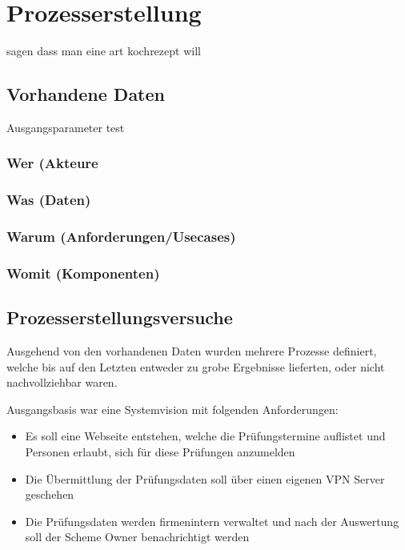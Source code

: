 \chapter{Prozesserstellung}

sagen dass man eine art kochrezept will

\section{Vorhandene Daten}
Ausgangsparameter test
\subsection{Wer (Akteure}
\subsection{Was (Daten)}
\subsection{Warum (Anforderungen/Usecases)}
\subsection{Womit (Komponenten)}

\section{Prozesserstellungsversuche}
Ausgehend von den vorhandenen Daten wurden mehrere Prozesse definiert, welche bis auf den Letzten entweder zu grobe Ergebnisse lieferten, oder nicht nachvollziehbar waren.

Ausgangsbasis war eine Systemvision mit folgenden Anforderungen:

\begin{itemize}
  \item Es soll eine Webseite entstehen, welche die Prüfungstermine auflistet und Personen erlaubt, sich für diese Prüfungen anzumelden
  \item Die Übermittlung der Prüfungsdaten soll über einen eigenen VPN Server geschehen
  \item Die Prüfungsdaten werden firmenintern verwaltet und nach der Auswertung soll der Scheme Owner benachrichtigt werden
\end{itemize}

